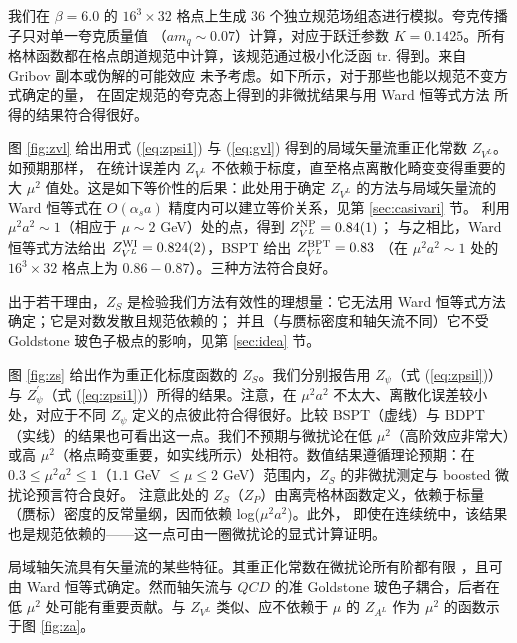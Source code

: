我们在 $\beta=6.0$ 的 $16^3 \times 32$ 格点上生成 $36$ 个独立规范场组态进行模拟。夸克传播子只对单一夸克质量值
（$am_q \sim 0.07$）计算，对应于跃迁参数 $K=0.1425$。所有格林函数都在格点朗道规范中计算，该规范通过极小化泛函
\beq
{\rm tr}\Bigl[ \sum_{\mu=1}^{4}\Bigl(U_{\mu}(x)+
U^{\dagger}_{\mu}(x)\Bigr)\Bigr].
\eeq
得到。来自 Gribov 副本或伪解的可能效应 \cite{giusti} 未予考虑。如下所示，对于那些也能以规范不变方式确定的量，
在固定规范的夸克态上得到的非微扰结果与用 Ward 恒等式方法 \cite{wi} 所得的结果符合得很好。


图 \ref{fig:zvl} 给出用式 (\ref{eq:zpsi1}) 与 (\ref{eq:gvl}) 得到的局域矢量流重正化常数 $Z_{V^L}$。如预期那样，
在统计误差内 $Z_{V^L}$ 不依赖于标度，直至格点离散化畸变变得重要的大 $\mu^2$ 值处。这是如下等价性的后果：此处用于确定
$Z_{V^L}$ 的方法与局域矢量流的 Ward 恒等式在 $O(\alpha_s a)$ 精度内可以建立等价关系，见第 \ref{sec:casivari} 节。
利用 $\mu^2 a^2 \sim 1$（相应于 $\mu \sim 2$ GeV）处的点，得到 $Z^{{\rm NP}}_{V^L}=0.84(1)$；
与之相比，Ward 恒等式方法给出 $Z^{{\rm WI}}_{V^L}=0.824(2)$，BSPT 给出 $Z^{{\rm BPT}}_{V^L}=0.83$
（在 $\mu^2 a^2 \sim 1$ 处的 $16^3 \times 32$ 格点上为 $0.86-0.87$）。三种方法符合良好。


出于若干理由，$Z_S$ 是检验我们方法有效性的理想量：它无法用 Ward 恒等式方法确定；它是对数发散且规范依赖的；
并且（与赝标密度和轴矢流不同）它不受 Goldstone 玻色子极点的影响，见第 \ref{sec:idea} 节。

图 \ref{fig:zs} 给出作为重正化标度函数的 $Z_S$。我们分别报告用 $Z_\psi$（式 (\ref{eq:zpsil})）与
$Z^\prime_\psi$（式 (\ref{eq:zpsi1})）所得的结果。注意，在 $\mu^2 a^2$ 不太大、离散化误差较小处，对应于不同
$Z_\psi$ 定义的点彼此符合得很好。比较 BSPT（虚线）与 BDPT（实线）的结果也可看出这一点。我们不预期与微扰论在低
$\mu^2$（高阶效应非常大）或高 $\mu^2$（格点畸变重要，如实线所示）处相符。数值结果遵循理论预期：在
$0.3 \le \mu^2 a^2 \le 1$（$1.1$ GeV $\le \mu \le 2$ GeV）范围内，$Z_S$ 的非微扰测定与 boosted 微扰论预言符合良好。
注意此处的 $Z_S$（$Z_P$）由离壳格林函数定义，依赖于标量（赝标）密度的反常量纲，因而依赖 log($\mu^2 a^2$)。此外，
即使在连续统中，该结果也是规范依赖的——这一点可由一圈微扰论的显式计算证明。


局域轴矢流具有矢量流的某些特征。其重正化常数在微扰论所有阶都有限 \cite{curci}，且可由 Ward 恒等式确定。然而轴矢流与
$QCD$ 的准 Goldstone 玻色子耦合，后者在低 $\mu^2$ 处可能有重要贡献。与 $Z_{V^L}$ 类似、应不依赖于 $\mu$ 的 $Z_{A^L}$
作为 $\mu^2$ 的函数示于图 \ref{fig:za}。

